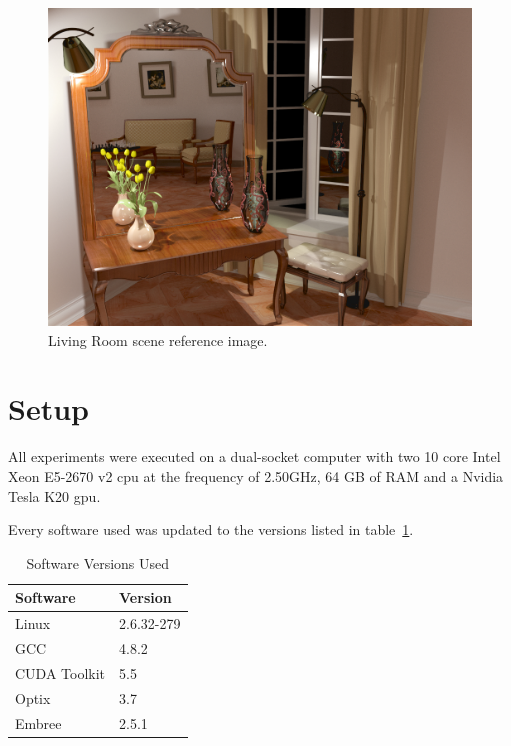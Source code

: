 \begin{figure}[ht]
\begin{minipage}[b]{0.3\linewidth}
\includegraphics[width=\linewidth]{img/livingroom_ref.jpg}
\caption{\label{img:livingroom_ref} Living Room scene reference image.}
\end{minipage}

\end{figure}

\section{Setup}

All experiments were executed on a dual-socket computer with two 10 core Intel Xeon E5-2670 v2 \gls{cpu} at the frequency of 2.50GHz, 64 GB of RAM and a Nvidia Tesla K20 \gls{gpu}.

Every software used was updated to the versions listed in table~\ref{tab:soft_ver}.

\begin{table}[h]
\centering
\begin{tabular}{|l|l|}

\hline
Software & Version \\
\hline
Linux & 2.6.32-279 \\
\hline
GCC & 4.8.2 \\
\hline
CUDA Toolkit & 5.5 \\
\hline
Optix & 3.7 \\
\hline
Embree & 2.5.1 \\
\hline

\end{tabular}
\caption{\label{tab:soft_ver} Software Versions Used}
\end{table}


